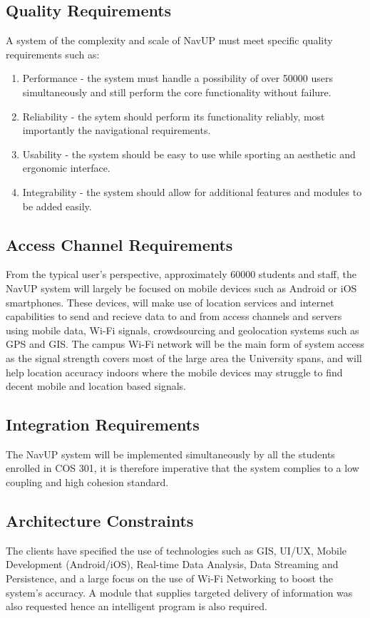 \documentclass[11pt, a4paper]{article}
\begin{document}
	\newpage
	\subsection{Quality Requirements}
				A system of the complexity and scale of NavUP must meet specific quality requirements such as:
				
				\begin{enumerate}
				\renewcommand{\labelenumi}{{\textbf{\arabic{enumi}.}}}
				\item Performance - the system must handle a possibility of over 50000 users simultaneously and still perform the core functionality without failure.
				\item Reliability - the sytem should perform its functionality reliably,  most importantly the navigational requirements.
				\item Usability - the system should be easy to use while sporting an aesthetic and ergonomic interface.
				\item Integrability - the system should allow for additional features and modules to be added easily.
				\end{enumerate}
				

			\subsection{Access Channel Requirements}
				From the typical user's perspective,  approximately 60000 students and staff,  the NavUP system will largely be focused on mobile devices such as Android or iOS smartphones.
				These devices,  will make use of location services and internet capabilities to send and recieve data to and from access channels and servers using mobile data, 
				Wi-Fi signals,  crowdsourcing and geolocation systems such as GPS and GIS. The campus Wi-Fi network will be the main form of system access as the signal
				strength covers most of the large area the University spans,  and will help location accuracy indoors where the mobile devices may struggle to find decent mobile
				and location based signals.

			
			\subsection{Integration Requirements}
				The NavUP system will be implemented simultaneously by all the students enrolled in COS 301,  it is therefore imperative that the system complies to a low coupling and high cohesion standard.
			\subsection{Architecture Constraints}
				The clients have specified the use of technologies such as GIS,  UI/UX,  Mobile Development (Android/iOS),   Real-time Data Analysis,  Data Streaming and
				Persistence,  and a large focus on the use of Wi-Fi Networking to boost the system's accuracy. A module that supplies targeted delivery of information was also requested hence an intelligent program is also required.
				
\end{document}
